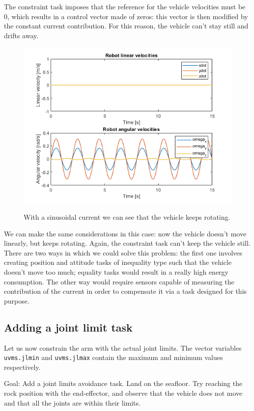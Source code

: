 \documentclass{article}
\begin{document}
The constraint task imposes that the reference for the vehicle velocities must be 0, which results in a control vector made of zeros: this vector is then modified by the constant current contribution. For this reason, the vehicle can't stay still and drifts away.
\begin{figure}[H]
	\centering
	\caption{With a sinusoidal current we can see that the vehicle keeps rotating.}
	\includegraphics[scale=0.55]{images/Ex4/Constraint_WithSinusoidalCurrent_LinAngVel}
	\label{fig:ex4.1.3SinusoidalCurrent}
\end{figure}
We can make the same considerations in this case: now the vehicle doesn't move linearly, but keeps rotating. Again, the constraint task can't keep the vehicle still.\\
There are two ways in which we could solve this problem: the first one involves creating position and attitude tasks of inequality type such that the vehicle doesn't move too much; equality tasks would result in a really high energy consumption. The other way would require sensors capable of measuring the contribution of the current in order to compensate it via a task designed for this purpose.


\subsection{Adding a joint limit task}
Let us now constrain the arm with the actual joint limits. The vector variables \texttt{uvms.jlmin} and \texttt{uvms.jlmax} contain the maximum and minimum values respectively.

Goal: Add a joint limits avoidance task. Land on the seafloor. Try reaching the rock position with the end-effector, and observe that the vehicle does not move and that all the joints are within their limits.
\end{document}
